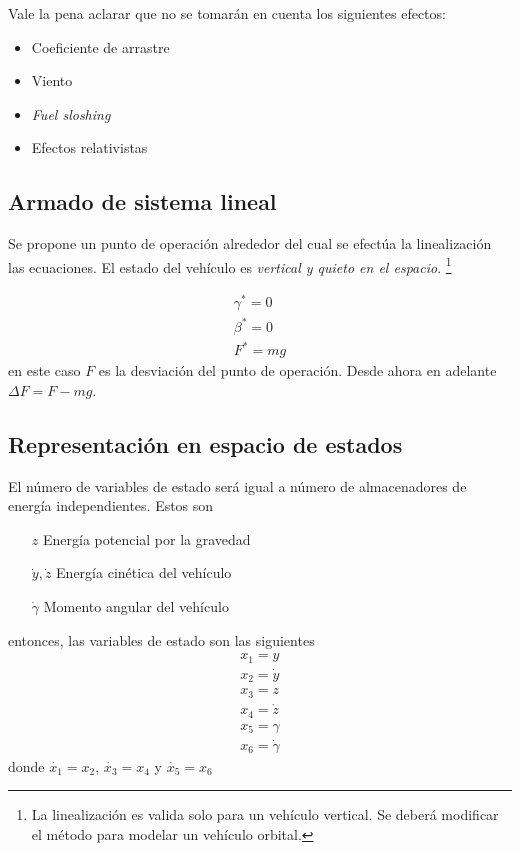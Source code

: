 Vale la pena aclarar que no se tomarán en cuenta los siguientes efectos:
\begin{itemize}
	\item Coeficiente de arrastre
	\item Viento
	\item \textit{Fuel sloshing}
	\item Efectos relativistas
\end{itemize}

\subsection{Armado de sistema lineal}

Se propone un punto de operación alrededor del cual se efectúa la linealización las ecuaciones. El estado del vehículo es \textit{vertical y quieto en el espacio}. \footnote{La linealización es valida solo para un vehículo vertical. Se deberá modificar el método para modelar un vehículo orbital.} 

\begin{align*}
	\gamma^* = 0 \\
	\beta^* = 0 \\
	F^* = mg
\end{align*}
en este caso $F$ es la desviación del punto de operación. Desde ahora en adelante $\Delta F = F- mg$.

\subsection{Representación en espacio de estados}
El número de variables de estado será igual a número de almacenadores de energía independientes. Estos son

\begin{enumerate}
	\item[$z$] Energía potencial por la gravedad
	\item[$\dot{y},\dot{z}$] Energía cinética del vehículo
	\item[$\dot{\gamma}$] Momento angular del vehículo
\end{enumerate}
entonces, las variables de estado son las siguientes
\begin{align*}
	x_1 = y \\
	x_2 = \dot{y} \\
	x_3 = z \\
	x_4 = \dot{z} \\
	x_5 = \gamma \\
	x_6 = \dot{\gamma}
\end{align*}
donde $\dot{x_1} = x_2$, $\dot{x_3} = x_4$ y $\dot{x_5} = x_6$

